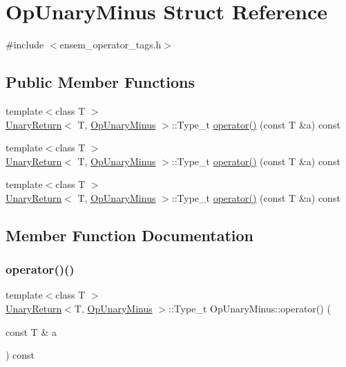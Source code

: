 \hypertarget{structOpUnaryMinus}{}\section{Op\+Unary\+Minus Struct Reference}
\label{structOpUnaryMinus}


{\ttfamily \#include $<$ensem\+\_\+operator\+\_\+tags.\+h$>$}

\subsection*{Public Member Functions}
\begin{DoxyCompactItemize}
\item 
{\footnotesize template$<$class T $>$ }\\\mbox{\hyperlink{structUnaryReturn}{Unary\+Return}}$<$ T, \mbox{\hyperlink{structOpUnaryMinus}{Op\+Unary\+Minus}} $>$\+::Type\+\_\+t \mbox{\hyperlink{structOpUnaryMinus_a76748f9d3b2f6a7bebac4a7427f86e3d}{operator()}} (const T \&a) const
\item 
{\footnotesize template$<$class T $>$ }\\\mbox{\hyperlink{structUnaryReturn}{Unary\+Return}}$<$ T, \mbox{\hyperlink{structOpUnaryMinus}{Op\+Unary\+Minus}} $>$\+::Type\+\_\+t \mbox{\hyperlink{structOpUnaryMinus_a76748f9d3b2f6a7bebac4a7427f86e3d}{operator()}} (const T \&a) const
\item 
{\footnotesize template$<$class T $>$ }\\\mbox{\hyperlink{structUnaryReturn}{Unary\+Return}}$<$ T, \mbox{\hyperlink{structOpUnaryMinus}{Op\+Unary\+Minus}} $>$\+::Type\+\_\+t \mbox{\hyperlink{structOpUnaryMinus_a76748f9d3b2f6a7bebac4a7427f86e3d}{operator()}} (const T \&a) const
\end{DoxyCompactItemize}


\subsection{Member Function Documentation}
\mbox{\label{structOpUnaryMinus_a76748f9d3b2f6a7bebac4a7427f86e3d}} 
\subsubsection{\texorpdfstring{operator()()}{operator()()}\hspace{0.1cm}{\footnotesize\ttfamily [1/3]}}
{\footnotesize\ttfamily template$<$class T $>$ \\
\mbox{\hyperlink{structUnaryReturn}{Unary\+Return}}$<$T, \mbox{\hyperlink{structOpUnaryMinus}{Op\+Unary\+Minus}} $>$\+::Type\+\_\+t Op\+Unary\+Minus\+::operator() (\begin{DoxyParamCaption}\item[{const T \&}]{a }\end{DoxyParamCaption}) const\hspace{0.3cm}{\ttfamily [inline]}}

